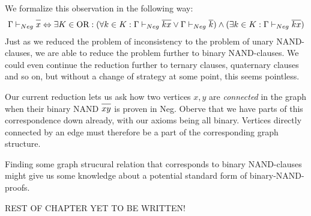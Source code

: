 We formalize this observation in the following way:
\begin{align}
  \Gamma \vdash_{Neg} \ol{x} \Leftrightarrow \exists K \in \text{OR}: (\forall k \in K: \Gamma \vdash_{Neg} \ol{kx} \vee \Gamma \vdash_{Neg} \ol{k}) \wedge (\exists k \in K: \Gamma \vdash_{Neg} \ol{kx})
\end{align}
Just as we reduced the problem of inconsistency to the problem of unary NAND-clauses, we are able to reduce the problem further to binary NAND-clauses.
We could even continue the reduction further to ternary clauses, quaternary clauses and so on, but without a change of strategy at some point, this seems pointless.

Our current reduction lets us ask how two vertices $x,y$ are \textit{connected} in the graph when their binary NAND $\ol{xy}$ is proven in Neg.
Oberve that we have parts of this correspondence down already, with our axioms being all binary.
Vertices directly connected by an edge must therefore be a part of the corresponding graph structure.

Finding some graph strucural relation that corresponds to binary NAND-clauses might give us some knowledge about a potential standard form of binary-NAND-proofs.

REST OF CHAPTER YET TO BE WRITTEN!
